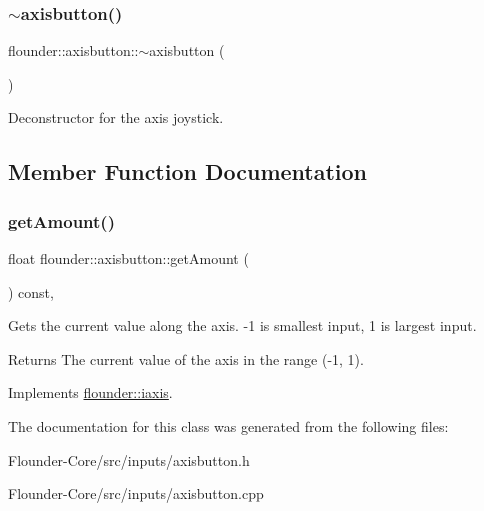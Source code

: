 \subsubsection{\texorpdfstring{$\sim$axisbutton()}{~axisbutton()}}
{\footnotesize\ttfamily flounder\+::axisbutton\+::$\sim$axisbutton (\begin{DoxyParamCaption}{ }\end{DoxyParamCaption})}



Deconstructor for the axis joystick. 



\subsection{Member Function Documentation}
\mbox{\label{classflounder_1_1axisbutton_aa5589f11ec6a9f4e6d01727903581539}} 
\subsubsection{\texorpdfstring{get\+Amount()}{getAmount()}}
{\footnotesize\ttfamily float flounder\+::axisbutton\+::get\+Amount (\begin{DoxyParamCaption}{ }\end{DoxyParamCaption}) const\hspace{0.3cm}{\ttfamily [override]}, {\ttfamily [virtual]}}



Gets the current value along the axis. -\/1 is smallest input, 1 is largest input. 

\begin{DoxyReturn}{Returns}
The current value of the axis in the range (-\/1, 1). 
\end{DoxyReturn}


Implements \hyperlink{classflounder_1_1iaxis_a990ecb5ffa5ec07b3d5e2e4016b2e4a0}{flounder\+::iaxis}.



The documentation for this class was generated from the following files\+:\begin{DoxyCompactItemize}
\item 
Flounder-\/\+Core/src/inputs/axisbutton.\+h\item 
Flounder-\/\+Core/src/inputs/axisbutton.\+cpp\end{DoxyCompactItemize}
